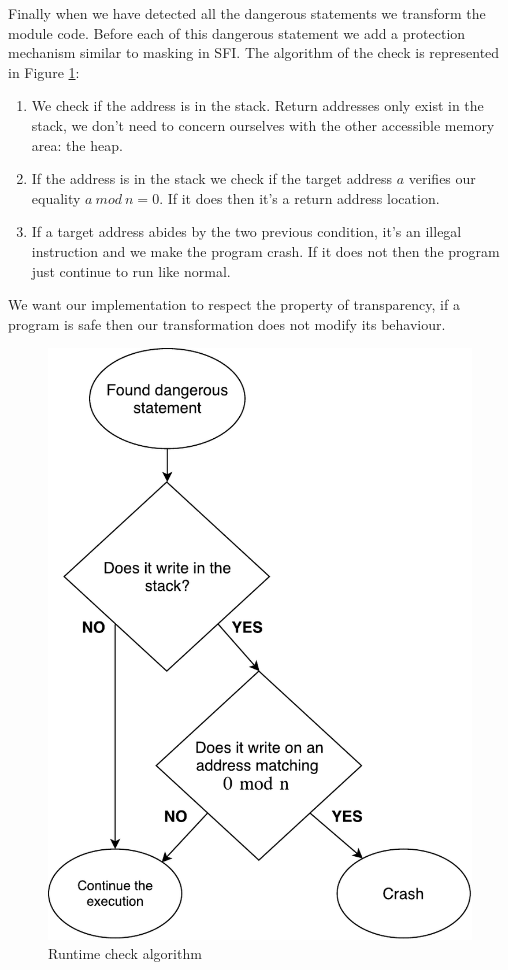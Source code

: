 \documentclass[11pt]{sdm}
\begin{document}
Finally when we have detected all the dangerous statements we transform the module code. Before each of this dangerous statement we add a protection mechanism similar to masking in SFI. The algorithm of the check is represented in Figure \ref{runtime_check}: \\
	\begin{enumerate}
		\item We check if the address is in the stack. Return addresses only exist in the stack, we don't need to concern ourselves with the other accessible memory area: the heap.
		\item If the address is in the stack we check if the target address $a$ verifies our equality $a~mod~n=0$. If it does then it's a return address location.
		\item If a target address abides by the two previous condition, it's an illegal instruction and we make the program crash. If it does not then the program just continue to run like normal.
	\end{enumerate}
We want our implementation to respect the property of transparency, if a program is safe then our transformation does not modify its behaviour.

\begin{figure}[!ht]
\centering
\includegraphics[scale=0.6]{images/runtime_check.pdf}
\caption{Runtime check algorithm}
\label{runtime_check}
\end{figure}
\end{document}
